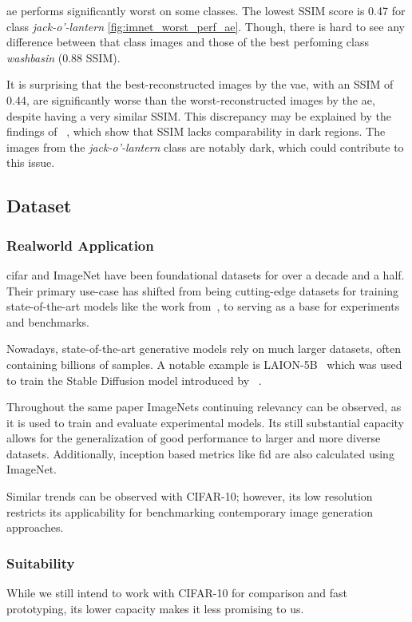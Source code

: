 \ac{ae} performs significantly worst on some classes. The lowest SSIM score is 0.47 for class \textit{jack-o'-lantern} \ref{fig:imnet_worst_perf_ae}. Though, there is hard to see any difference between that class images and those of the best perfoming class \textit{washbasin} (0.88 SSIM).

It is surprising that the best-reconstructed images by the \ac{vae}, with an SSIM of 0.44, are significantly worse than the worst-reconstructed images by the \ac{ae}, despite having a very similar SSIM. This discrepancy may be explained by the findings of ~\cite{understandingssim}, which show that SSIM lacks comparability in dark regions. The images from the \textit{jack-o'-lantern} class are notably dark, which could contribute to this issue.

\subsection{Dataset}\label{subsec:dataset}

\subsubsection{Realworld Application}
\ac{cifar} and ImageNet have been foundational datasets for over a decade and a half.
Their primary use-case has shifted from being cutting-edge datasets for training state-of-the-art models like the
work from~\cite{AlexNet}, to serving as a base for experiments and benchmarks.

Nowadays, state-of-the-art generative models rely on much larger datasets, often containing billions of samples.
A notable example is LAION-5B~\cite{laion5b} which was used to train the Stable Diffusion model introduced by~
\cite{stable_diff}.

Throughout the same paper ImageNets continuing relevancy can be observed, as it is used to train and evaluate
experimental models.
Its still substantial capacity allows for the generalization of good performance to larger and more diverse datasets.
Additionally, inception based metrics like \ac{fid} are also calculated using ImageNet.

Similar trends can be observed with CIFAR-10; however, its low resolution restricts its applicability for
benchmarking contemporary image generation approaches.

\subsubsection{Suitability}
While we still intend to work with CIFAR-10 for comparison and fast prototyping, its lower capacity makes it less
promising to us.

